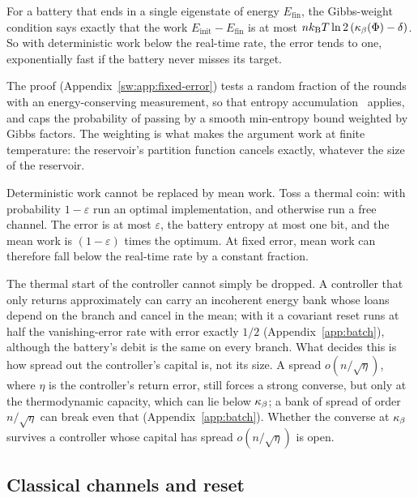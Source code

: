 For a battery that ends in a single eigenstate of energy $E_{\mathrm{fin}}$, the Gibbs-weight condition says exactly that the work $E_{\mathrm{init}}-E_{\mathrm{fin}}$ is at most $nk_{\mathrm B} T\ln2\,(\kappa_\beta(\Phi)-\delta)$. So with deterministic work below the real-time rate, the error tends to one, exponentially fast if the battery never misses its target.

The proof (Appendix~\ref{sw:app:fixed-error}) tests a random fraction of the rounds with an energy-conserving measurement, so that entropy accumulation~\cite{DFR20} applies, and caps the probability of passing by a smooth min-entropy bound weighted by Gibbs factors. The weighting is what makes the argument work at finite temperature: the reservoir's partition function cancels exactly, whatever the size of the reservoir.

\begin{remark}\label{sw:rem:meanwork}
Deterministic work cannot be replaced by mean work. Toss a thermal coin: with probability $1-\varepsilon$ run an optimal implementation, and otherwise run a free channel. The error is at most $\varepsilon$, the battery entropy at most one bit, and the mean work is $(1-\varepsilon)$ times the optimum. At fixed error, mean work can therefore fall below the real-time rate by a constant fraction.
\end{remark}

\begin{remark}\label{sw:rem:thermal-controller}
The thermal start of the controller cannot simply be dropped. A controller that only returns approximately can carry an incoherent energy bank whose loans depend on the branch and cancel in the mean; with it a covariant reset runs at half the vanishing-error rate with error exactly $1/2$ (Appendix~\ref{app:batch}), although the battery's debit is the same on every branch. What decides this is how spread out the controller's capital is, not its size. A spread $o(n/\sqrt\eta)$, where $\eta$ is the controller's return error, still forces a strong converse, but only at the thermodynamic capacity, which can lie below $\kappa_\beta$; a bank of spread of order $n/\sqrt\eta$ can break even that (Appendix~\ref{app:batch}). Whether the converse at $\kappa_\beta$ survives a controller whose capital has spread $o(n/\sqrt\eta)$ is open.
\end{remark}

\subsection{Classical channels and reset}\label{sw:sec:classical}

